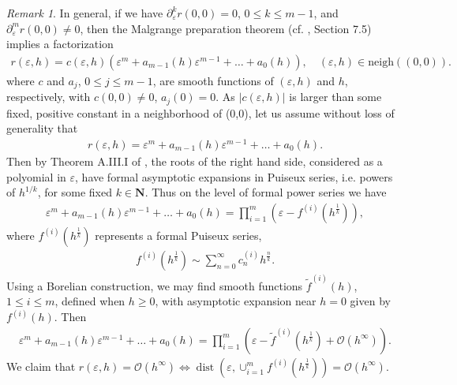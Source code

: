 \documentclass[12pt,lettersize]{article}
\DeclareMathOperator{\dist}{dist}
\renewcommand{\epsilon}{\varepsilon}
\theoremstyle{plain}%
\numberwithin{theorem}{section}
\numberwithin{equation}{section}
\theoremstyle{definition}
\theoremstyle{remark}
\newtheorem{remark}[theorem]{Remark}
\begin{document}
{\begin{remark}
In general, if we have $\partial_\epsilon^k r(0,0) = 0$, $0 \leq k \leq m-1$, and $\partial_\epsilon^m r(0,0) \neq 0$, then the Malgrange preparation theorem (cf. \cite{HormanderVolI}, Section 7.5) implies a factorization
%
\begin{align}\label{malgrange}
r(\epsilon,h) = c(\epsilon,h)(\epsilon^m + a_{m-1}(h)\epsilon^{m-1} + \ldots +a_0(h)),\quad (\epsilon,h) \in \mbox{neigh}((0,0)).
\end{align}
%
where $c$ and $a_j$, $0\leq j \leq m-1$, are smooth functions of $(\epsilon,h)$ and $h$, respectively, with $c(0,0)\neq 0$, $a_j(0) = 0$.
As $|c(\epsilon,h)|$ is larger than some fixed, positive constant in a neighborhood of (0,0), let us assume without loss of generality that
%
\begin{align*}
r(\epsilon,h) = \epsilon^m + a_{m-1}(h)\epsilon^{m-1} + \ldots + a_0(h).
\end{align*}
%
Then by Theorem A.III.I of \cite{GerardPoles}, the roots of the right hand side, considered as a polyomial in $\epsilon$, have formal asymptotic expansions in Puiseux series, i.e. powers of $h^{1/k}$, for some fixed $k\in \mathbf{N}$. Thus on the level of formal power series we have
%
\begin{align*}{}
\epsilon^m + a_{m-1}(h)\epsilon^{m-1} + \ldots + a_0(h) = \prod_{i = 1}^m (\epsilon-f^{(i)}(h^\frac{1}{k})),
\end{align*}
%
where $f^{(i)}(h^\frac{1}{k})$ represents a formal Puiseux series,
%
\begin{align*}
f^{(i)}(h^\frac{1}{k}) \sim \sum_{n=0}^\infty c^{(i)}_n h^\frac{n}{k}.
\end{align*}
%
Using a Borelian construction, we may find smooth functions $\tilde f^{(i)}(h)$, $1 \leq i \leq m$, defined when $h \geq 0$, with asymptotic expansion near $h = 0$ given by $f^{(i)}(h)$. Then 
%
\begin{align}\label{factors}
\epsilon^m + a_{m-1}(h)\epsilon^{m-1} + \ldots + a_0(h) = \prod_{i = 1}^m (\epsilon-\tilde f^{(i)}(h^\frac{1}{k}) + \mathcal{O}(h^\infty)).
\end{align}
%
We claim that $r(\epsilon,h) = \mathcal{O}(h^\infty) \iff \dist(\epsilon,\cup_{i=1}^m f^{(i)}(h^\frac{1}{k})) = \mathcal{O}(h^\infty)$. 


\end{remark}}
\end{document}
